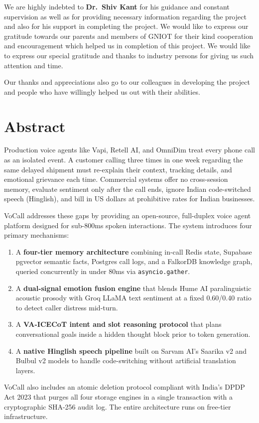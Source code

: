 \documentclass[12pt,a4paper]{article}
\begin{document}
We are highly indebted to \textbf{Dr.~Shiv Kant} for his guidance and constant supervision as well as for providing necessary information regarding the project and also for his support in completing the project. We would like to express our gratitude towards our parents and members of GNIOT for their kind cooperation and encouragement which helped us in completion of this project. We would like to express our special gratitude and thanks to industry persons for giving us such attention and time.

\vspace{0.6cm}

Our thanks and appreciations also go to our colleagues in developing the project and people who have willingly helped us out with their abilities.

\newpage
\hypersetup{pageanchor=true}
\tableofcontents
\newpage
{}

\section{Abstract}
Production voice agents like Vapi, Retell AI, and OmniDim treat every phone call as an isolated event. A customer calling three times in one week regarding the same delayed shipment must re-explain their context, tracking details, and emotional grievance each time. Commercial systems offer no cross-session memory, evaluate sentiment only after the call ends, ignore Indian code-switched speech (Hinglish), and bill in US dollars at prohibitive rates for Indian businesses.

VoCall addresses these gaps by providing an open-source, full-duplex voice agent platform designed for sub-800ms spoken interactions. The system introduces four primary mechanisms:
\begin{enumerate}[leftmargin=*]
    \item A \textbf{four-tier memory architecture} combining in-call Redis state, Supabase pgvector semantic facts, Postgres call logs, and a FalkorDB knowledge graph, queried concurrently in under 80ms via \texttt{asyncio.gather}.
    \item A \textbf{dual-signal emotion fusion engine} that blends Hume AI paralinguistic acoustic prosody with Groq LLaMA text sentiment at a fixed 0.60/0.40 ratio to detect caller distress mid-turn.
    \item A \textbf{VA-ICECoT intent and slot reasoning protocol} that plans conversational goals inside a hidden thought block prior to token generation.
    \item A \textbf{native Hinglish speech pipeline} built on Sarvam AI's Saarika v2 and Bulbul v2 models to handle code-switching without artificial translation layers.
\end{enumerate}
VoCall also includes an atomic deletion protocol compliant with India's DPDP Act 2023 that purges all four storage engines in a single transaction with a cryptographic SHA-256 audit log. The entire architecture runs on free-tier infrastructure.
\end{document}
